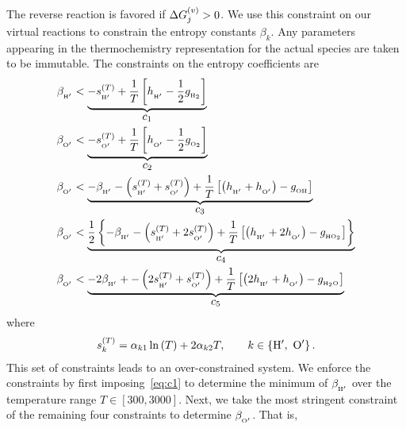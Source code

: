 \documentclass[fontsize=12pt, %
               paper=a4, %
               hyperref]{report}
\begin{document}
  The reverse reaction is favored if $\Delta G_{j}^{\left(v\right)} > 0$.  
  We use this constraint on our virtual reactions to constrain 
  the entropy constants $\beta_{k}$.  Any parameters 
  appearing in the thermochemistry representation for the actual 
  species are taken to be immutable.  The constraints on the 
  entropy coefficients are 
  \begin{align}
    \beta_{_{\ce{H}^{\prime}}} &< \underbrace{-s_{_{\ce{H}^{\prime}}}^{\lr{T}} + 
          \frac{1}{T}\left[h_{_{\ce{H}^{\prime}}} - \frac{1}{2}g_{_{\ce{H2}}}\right]}_{\displaystyle c_{1}}
      \label{eq:c1} \\
    \beta_{_{\ce{O}^{\prime}}} &< \underbrace{-s_{_{\ce{O}^{\prime}}}^{\lr{T}} + 
          \frac{1}{T}\left[h_{_{\ce{O}^{\prime}}} - \frac{1}{2}g_{_{\ce{O2}}}\right]}_{\displaystyle c_{2}} 
      \label{eq:c2} \\
    \beta_{_{\ce{O}^{\prime}}} &< \underbrace{-\beta_{_{\ce{H}^{\prime}}} 
       -\lr{s_{_{\ce{H}^{\prime}}}^{\lr{T}} + s_{_{\ce{O}^{\prime}}}^{\lr{T}}} + 
       \frac{1}{T}\left[\lr{h_{_{\ce{H}^{\prime}}} + h_{_{\ce{O}^{\prime}}}} - g_{_{\ce{OH}}}\right] 
       }_{\displaystyle c_{3}}
      \label{eq:c3} \\
    \beta_{_{\ce{O}^{\prime}}} &< \underbrace{\frac{1}{2}\left\{-\beta_{_{\ce{H}^{\prime}}}
       -\lr{s_{_{\ce{H}^{\prime}}}^{\lr{T}} + 2s_{_{\ce{O}^{\prime}}}^{\lr{T}}} + 
       \frac{1}{T}\left[\lr{h_{_{\ce{H}^{\prime}}} + 2h_{_{\ce{O}^{\prime}}}} - g_{_{\ce{HO2}}}\right] 
       \right\}}_{\displaystyle c_{4}}
      \label{eq:c4} \\
    \beta_{_{\ce{O}^{\prime}}} &< \underbrace{-2\beta_{_{\ce{H}^{\prime}}} + 
       -\lr{2s_{_{\ce{H}^{\prime}}}^{\lr{T}} + s_{_{\ce{O}^{\prime}}}^{\lr{T}}} + 
       \frac{1}{T}\left[\lr{2h_{_{\ce{H}^{\prime}}} + h_{_{\ce{O}^{\prime}}}} - g_{_{\ce{H2O}}}\right]
       }_{\displaystyle c_{5}}
      \label{eq:c5}
  \end{align}
  where
  \begin{align}
    s_{k}^{\lr{T}} = \alpha_{k1}\ln\lr{T} + 2\alpha_{k2}T, \qquad 
         k\in\left\{\ce{H}^{\prime}, \ \ce{O}^{\prime}\right\}.
  \end{align}
  This set of constraints leads to an over-constrained system.  We enforce 
  the constraints by first imposing~\eqref{eq:c1} to determine the minimum of 
  $\beta_{_{\ce{H}^{\prime}}}$ over the temperature range $T\in\left[300, 3000\right]$.  
  Next, we take the most stringent constraint of the remaining four constraints 
  to determine $\beta_{_{\ce{O}^{\prime}}}$.  That is, 
\end{document}
